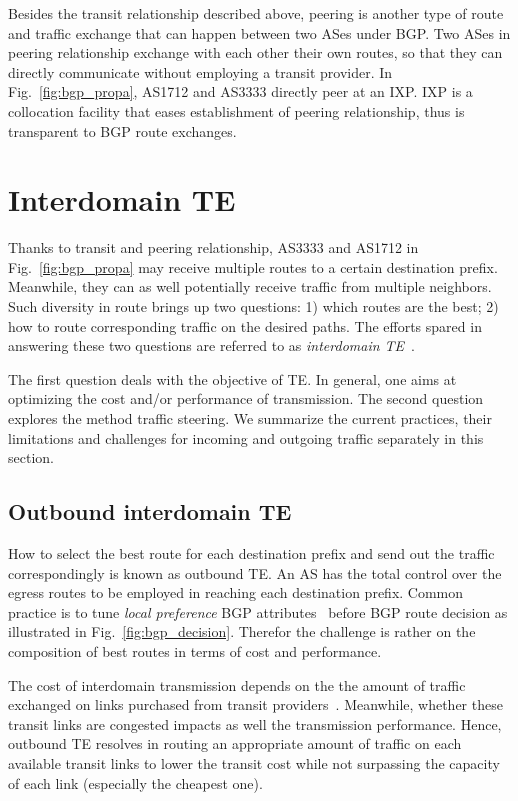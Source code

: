 Besides the transit relationship described above, peering is another type of route and traffic exchange that can happen between two ASes under BGP. Two ASes in peering relationship exchange with each other their own routes, so that they can directly communicate without employing a transit provider.
In Fig.~\ref{fig:bgp_propa}, AS1712 and AS3333 directly peer at an \ac{IXP}.
\ac{IXP} is a collocation facility that eases establishment of peering relationship, thus is transparent to BGP route exchanges.

\section{Interdomain TE}
Thanks to transit and peering relationship, AS3333 and AS1712 in Fig.~\ref{fig:bgp_propa} may receive multiple routes to a certain destination prefix. Meanwhile, they can as well potentially receive traffic from multiple neighbors.
Such diversity in route brings up two questions: 1) which routes are the best; 2) how to route corresponding traffic on the desired paths.
The efforts spared in answering these two questions are referred to as \textit{interdomain \ac{TE}}~\cite{Quoitin2004a,Quoitin2003,Feamster2003}.

The first question deals with the objective of \ac{TE}. In general, one aims at optimizing the cost and/or performance of transmission.
The second question explores the method traffic steering.
We summarize the current practices, their limitations and challenges for incoming and outgoing traffic separately in this section.

\subsection{Outbound interdomain TE}
How to select the best route for each destination prefix and send out the traffic correspondingly is known as outbound TE. 
An AS has the total control over the egress routes to be employed in reaching each destination prefix. Common practice is to tune \textit{local preference} BGP attributes~\cite{Wang2008} before BGP route decision as illustrated in Fig.~\ref{fig:bgp_decision}. 
Therefor the challenge is rather on the composition of best routes in terms of cost and performance.

The cost of interdomain transmission depends on the the amount of traffic exchanged on links purchased from transit providers~\cite{drpeering-95th}.
Meanwhile, whether these transit links are congested impacts as well the transmission performance.
Hence, outbound TE resolves in routing an appropriate amount of traffic on each available transit links to lower the transit cost while not surpassing the capacity of each link (especially the cheapest one).

